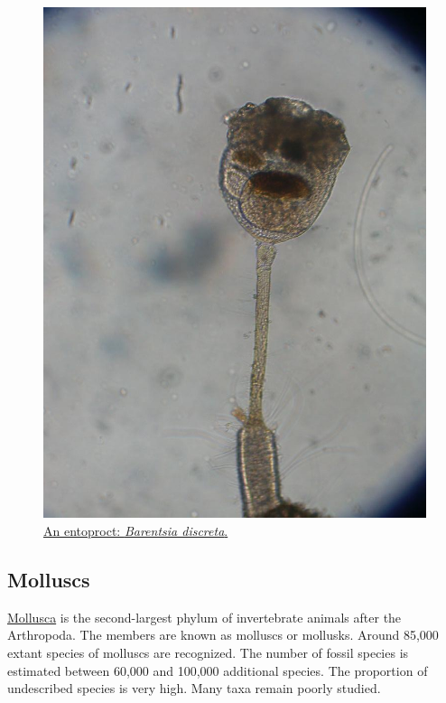 \begin{figure}

{\centering \includegraphics[width=0.7\linewidth]{./figures/animals/Barentsa_discreta_suzukokemusi02} 

}

\caption{\href{https://commons.wikimedia.org/wiki/File:Barentsa_discreta_suzukokemusi02.jpg}{An entoproct: \emph{Barentsia discreta}.}}\label{fig:entoproctbarentsia}
\end{figure}

\hypertarget{molluscs}{%
\subsection{Molluscs}\label{molluscs}}

\href{https://en.wikipedia.org/wiki/Mollusca}{Mollusca} is the second-largest phylum of invertebrate animals after the Arthropoda. The members are known as molluscs or mollusks. Around 85,000 extant species of molluscs are recognized. The number of fossil species is estimated between 60,000 and 100,000 additional species. The proportion of undescribed species is very high. Many taxa remain poorly studied.



